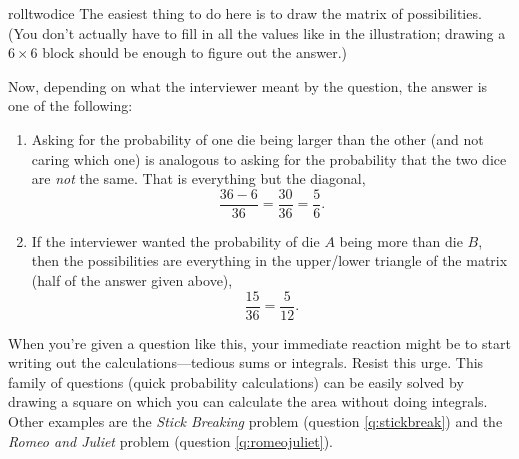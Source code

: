 \begin{answer}{rolltwodice}
The easiest thing to do here is to draw the matrix of possibilities.
(You don't actually have to fill in all the values like in the illustration; drawing a $6 \times 6$ block should be enough to figure out the answer.)
%
\begin{center}
\end{center}
%
Now, depending on what the interviewer meant by the question, the answer is one of the following:
\begin{enumerate}
  \item
Asking for the probability of one die being larger than the other (and not caring which one) is analogous to asking for the probability that the two dice are \emph{not} the same.
That is everything but the diagonal,
\[
  \frac{36- 6}{36} =  \frac{30}{36} = \frac{5}{6}
  \text{.}
\]
  \item
If the interviewer wanted the probability of die $A$ being more than die $B$, then the possibilities are everything in the upper/lower triangle of the matrix (half of the answer given above),
\[
  \frac{15}{36} = \frac{5}{12}
  \text{.}
\]
\end{enumerate}
When you're given a question like this, your immediate reaction might be to start writing out the calculations---tedious sums or integrals.
Resist this urge.
This family of questions (quick probability calculations) can be easily solved by drawing a square on which you can calculate the area without doing integrals.
Other examples are the
\emph{Stick Breaking} problem (question \ref{q:stickbreak})
and the
\emph{Romeo and Juliet} problem (question \ref{q:romeojuliet}).


\end{answer}
